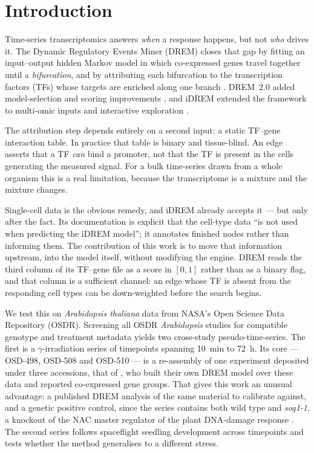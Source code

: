 \section{Introduction}

Time-series transcriptomics answers \emph{when} a response happens, but not \emph{who}
drives it. The Dynamic Regulatory Events Miner (DREM) closes that gap by fitting an
input--output hidden Markov model in which co-expressed genes travel together until a
\emph{bifurcation}, and by attributing each bifurcation to the transcription factors
(TFs) whose targets are enriched along one branch \citep{ernst2007drem}. DREM~2.0 added
model-selection and scoring improvements \citep{schulz2012drem2}, and iDREM extended the
framework to multi-omic inputs and interactive exploration \citep{ding2018idrem}.

The attribution step depends entirely on a second input: a static TF--gene interaction
table. In practice that table is binary and tissue-blind. An edge asserts that a TF
\emph{can} bind a promoter, not that the TF is present in the cells generating the
measured signal. For a bulk time-series drawn from a whole organism this is a real
limitation, because the transcriptome is a mixture and the mixture changes.

Single-cell data is the obvious remedy, and iDREM already accepts it --- but only after
the fact. Its documentation is explicit that the cell-type data ``is not used when
predicting the iDREM model''; it annotates finished nodes rather than informing them.
The contribution of this work is to move that information upstream, into the model
itself, without modifying the engine. DREM reads the third column of its TF--gene file as
a score in $[0,1]$ rather than as a binary flag, and that column is a sufficient channel:
an edge whose TF is absent from the responding cell types can be down-weighted before the
search begins.

We test this on \textit{Arabidopsis thaliana} data from NASA's Open Science Data
Repository (OSDR). Screening all \NumArabidopsisStudiesScreened{} OSDR
\textit{Arabidopsis} studies for compatible genotype and treatment metadata yields two
cross-study pseudo-time-series. The first is a $\gamma$-irradiation series of
\NumCohortATimepoints{} timepoints spanning 10~min to 72~h. Its core --- OSD-498, OSD-508
and OSD-510 --- is a re-assembly of one experiment deposited under three accessions, that
of \citet{bourbousse2018sog1}, who built their own DREM model over these data and
reported \NumPublishedGroups{} co-expressed gene groups. That gives this work an unusual
advantage: a published DREM analysis of the same material to calibrate against, and a
genetic positive control, since the series contains both wild type and \textit{sog1-1},
a knockout of the NAC master regulator of the plant DNA-damage response
\citep{yoshiyama2009sog1}. The second series follows spaceflight seedling development
across \NumCohortBTimepoints{} timepoints and tests whether the method generalises to a
different stress.
